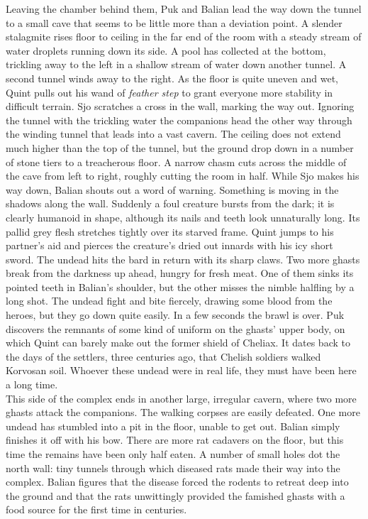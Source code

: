 Leaving the chamber behind them, Puk and Balian lead the way down the tunnel to a small cave that seems to be little more than a deviation point. A slender stalagmite rises floor to ceiling in the far end of the room with a steady stream of water droplets running down its side. A pool has collected at the bottom, trickling away to the left in a shallow stream of water down another tunnel. A second tunnel winds away to the right. As the floor is quite uneven and wet, Quint pulls out his wand of {\itshape feather step} to grant everyone more stability in difficult terrain. Sjo scratches a cross in the wall, marking the way out. Ignoring the tunnel with the trickling water the companions head the other way through the winding tunnel that leads into a vast cavern. The ceiling does not extend much higher than the top of the tunnel, but the ground drop down in a number of stone tiers to a treacherous floor. A narrow chasm cuts across the middle of the cave from left to right, roughly cutting the room in half. While Sjo makes his way down, Balian shouts out a word of warning. Something is moving in the shadows along the wall. Suddenly a foul creature bursts from the dark; it is clearly humanoid in shape, although its nails and teeth look unnaturally long. Its pallid grey flesh stretches tightly over its starved frame. Quint jumps to his partner's aid and pierces the creature's dried out innards with his icy short sword. The undead hits the bard in return with its sharp claws. Two more ghasts break from the darkness up ahead, hungry for fresh meat. One of them sinks its pointed teeth in Balian's shoulder, but the other misses the nimble halfling by a long shot. The undead fight and bite fiercely, drawing some blood from the heroes, but they go down quite easily. In a few seconds the brawl is over. Puk discovers the remnants of some kind of uniform on the ghasts' upper body, on which Quint can barely make out the former shield of Cheliax. It dates back to the days of the settlers, three centuries ago, that Chelish soldiers walked Korvosan soil. Whoever these undead were in real life, they must have been here a long time.\\

This side of the complex ends in another large, irregular cavern, where two more ghasts attack the companions. The walking corpses are easily defeated. One more undead has stumbled into a pit in the floor, unable to get out. Balian simply finishes it off with his bow. There are more rat cadavers on the floor, but this time the remains have been only half eaten. A number of small holes dot the north wall: tiny tunnels through which diseased rats made their way into the complex. Balian figures that the disease forced the rodents to retreat deep into the ground and that the rats unwittingly provided the famished ghasts with a food source for the first time in centuries.\\

